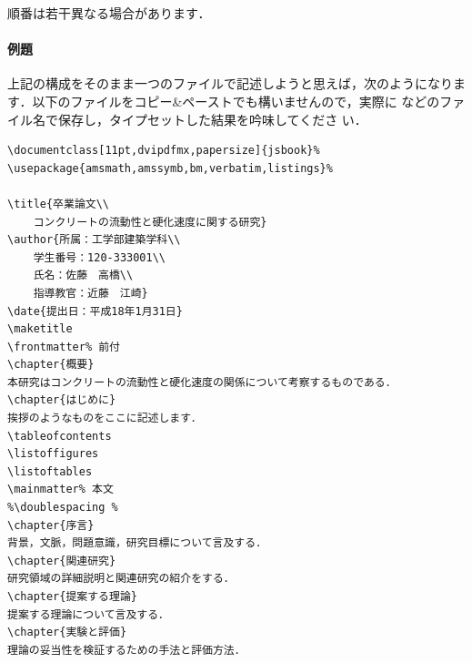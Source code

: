 順番は若干異なる場合があります．

\paragraph{例題}
上記の構成をそのまま一つのファイルで記述しようと思えば，次のようになりま
す．以下のファイルをコピー\&ペーストでも構いませんので，実際に
などのファイル名で保存し，タイプセットした結果を吟味してくださ
い．

\narrowbaselines
\begin{verbatim}
\documentclass[11pt,dvipdfmx,papersize]{jsbook}%
\usepackage{amsmath,amssymb,bm,verbatim,listings}%
 
\title{卒業論文\\
	コンクリートの流動性と硬化速度に関する研究}
\author{所属：工学部建築学科\\
	学生番号：120-333001\\
	氏名：佐藤　高橋\\
	指導教官：近藤　江崎}
\date{提出日：平成18年1月31日}
\maketitle 
\frontmatter% 前付 
\chapter{概要}
本研究はコンクリートの流動性と硬化速度の関係について考察するものである．
\chapter{はじめに}
挨拶のようなものをここに記述します．
\tableofcontents 
\listoffigures 
\listoftables 
\mainmatter% 本文 
%\doublespacing % 
\chapter{序言}
背景，文脈，問題意識，研究目標について言及する．
\chapter{関連研究}
研究領域の詳細説明と関連研究の紹介をする．
\chapter{提案する理論}
提案する理論について言及する．
\chapter{実験と評価}
理論の妥当性を検証するための手法と評価方法．

\end{verbatim}
